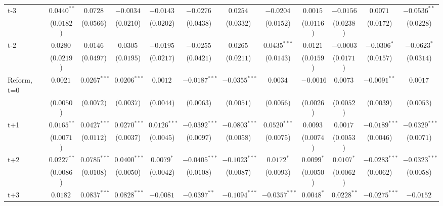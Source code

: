 \begin{landscape}
\begin{table}[htbp]
{\begin{tabular}{lccccccccccc}
t-3 &     $ 0.0440^{**} $ &     $ 0.0728^{} $ &  $ -0.0034^{} $  &  $ -0.0143^{} $  &     $ -0.0276^{} $ &     $ 0.0254^{} $ & $ -0.0204^{} $ & $ 0.0015^{} $ & $ -0.0156^{} $ & $ 0.0071^{} $ & $ -0.0536^{**} $  \\
&     ($0.0182$) &     ($0.0566$) & ($0.0210$)& ($ 0.0202$)  &    ($0.0438$)   &   ($0.0332$) &   ($0.0152$) &   ($0.0116$) &   ($0.0238$) &   ($0.0172$) &   ($0.0228$) \\
t-2 &     $ 0.0280^{} $ &     $ 0.0146^{} $ &  $ 0.0305^{} $  &  $ -0.0195^{} $  &     $ -0.0255^{} $ &     $ 0.0265^{} $ & $ 0.0435^{***} $ & $ 0.0121^{} $ & $ -0.0003^{} $ & $ -0.0306^{*} $ & $ -0.0623^{*} $  \\
&     ($0.0219$) &     ($0.0497$) & ($0.0195$)& ($ 0.0217$)  &    ($0.0421$)   &   ($0.0211$) &   ($0.0143$) &   ($0.0159$) &   ($0.0171$) &   ($0.0157$) &   ($0.0314$) \\
Reform, t=0 &     $ 0.0021^{} $ &     $ 0.0267^{***} $ &  $ 0.0206^{***} $  &  $ 0.0012^{} $  &     $ -0.0187^{***} $ &     $ -0.0355^{***} $ & $ 0.0034^{} $ & $ -0.0016^{} $ & $ 0.0073^{} $ & $ -0.0091^{**} $ & $ 0.0017^{} $  \\
&     ($0.0050$) &     ($0.0072$) & ($0.0037$)& ($ 0.0044$)  &    ($0.0063$)   &   ($0.0051$) &   ($0.0056$) &   ($0.0026$) &   ($0.0052$) &   ($0.0039$) &   ($0.0053$) \\
t+1 &     $ 0.0165^{**} $ &     $ 0.0427^{***} $ &  $ 0.0270^{***} $  &  $ 0.0126^{***} $  &     $ -0.0392^{***} $ &     $ -0.0803^{***} $ & $ 0.0520^{***} $ & $ 0.0093^{} $ & $ 0.0017^{} $ & $ -0.0189^{***} $ & $ -0.0329^{***} $  \\
&     ($0.0071$) &     ($0.0112$) & ($0.0037$)& ($ 0.0045$)  &    ($0.0097$)   &   ($0.0058$) &   ($0.0075$) &   ($0.0074$) &   ($0.0053$) &   ($0.0046$) &   ($0.0071$) \\
t+2 &     $ 0.0227^{**} $ &     $ 0.0785^{***} $ &  $ 0.0400^{***} $  &  $ 0.0079^{*} $  &     $ -0.0405^{***} $ &     $ -0.1023^{***} $ & $ 0.0172^{*} $ & $ 0.0099^{*} $ & $ 0.0107^{*} $ & $ -0.0283^{***} $ & $ -0.0323^{***} $  \\
&     ($0.0086$) &     ($0.0108$) & ($0.0050$)& ($ 0.0042$)  &    ($0.0108$)   &   ($0.0087$) &   ($0.0093$) &   ($0.0050$) &   ($0.0062$) &   ($0.0062$) &   ($0.0058$) \\
t+3 &     $ 0.0182^{} $ &     $ 0.0837^{***} $ &  $ 0.0828^{***} $  &  $ -0.0081^{} $  &     $ -0.0397^{**} $ &     $ -0.1094^{***} $ & $ -0.0357^{***} $ & $ 0.0048^{*} $ & $ 0.0228^{**} $ & $ -0.0275^{***} $ & $ -0.0152^{} $  \\

\end{tabular}}
\end{table}
\end{landscape}
